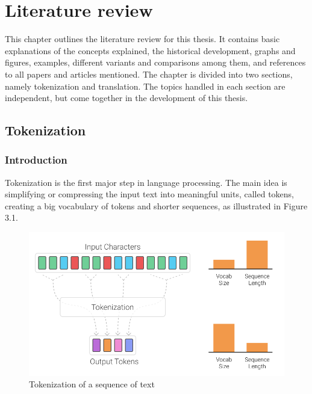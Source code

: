 %
%

\chapter{Literature review}\label{ch:literature}

This chapter outlines the literature review for this thesis. It contains basic explanations of the concepts explained, the historical development, graphs and figures, examples, different variants and comparisons among them, and references to all papers and articles mentioned. The chapter is divided into two sections, namely tokenization and translation. The topics handled in each section are independent, but come together in the development of this thesis.

\section{Tokenization}\label{sec:tokenization}

\subsection{Introduction}

Tokenization is the first major step in language processing. The main idea is simplifying or compressing the input text into meaningful units, called tokens, creating a big vocabulary of tokens and shorter sequences, as illustrated in Figure 3.1.~\cite{manning2008introduction}

\begin{figure}[!ht]
    \centering
    \includegraphics[width=14cm]{figures/tokenization.png}
    \caption{Tokenization of a sequence of text}
\end{figure}

